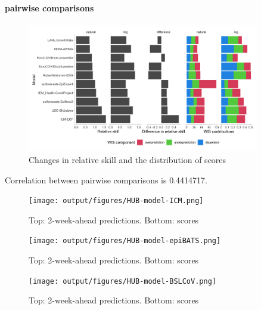 \documentclass{article}
\begin{document}
\paragraph{pairwise comparisons}
\begin{figure}[h!]
    \centering
    \includegraphics[width=0.9\textwidth]{output/figures/HUB-pairwise-comparisons.png}
    \caption{Changes in relative skill and the distribution of scores}
    \label{fig:HUB-pairwise}
\end{figure}

Correlation between pairwise comparisons is 0.4414717. 





\begin{figure}[h!]
    \centering
    \texttt{[image: output/figures/HUB-model-ICM.png]}
    \caption{Top: 2-week-ahead predictions. Bottom: scores }
    \label{fig:HUB-model-ICM}
\end{figure}


\begin{figure}[h!]
    \centering
    \texttt{[image: output/figures/HUB-model-epiBATS.png]}
    \caption{Top: 2-week-ahead predictions. Bottom: scores }
    \label{fig:HUB-model-epiBATS}
\end{figure}


\begin{figure}[h!]
    \centering
    \texttt{[image: output/figures/HUB-model-BSLCoV.png]}
    \caption{Top: 2-week-ahead predictions. Bottom: scores }
    \label{fig:HUB-model-BSLCoV}
\end{figure}
\end{document}
